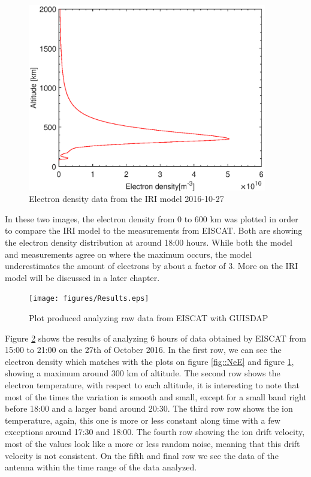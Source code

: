 \begin{minipage}{0.45\textwidth}
	\begin{flushright}
	\begin{figure}[H]
	\centering
	\includegraphics[width=0.93\textwidth]{figures/NeIRI.eps}
	\caption{Electron density data from the IRI model 2016-10-27}
	\label{fig::NeIRI1}
	\end{figure}
	\end{flushright}
\end{minipage}

In these two images, the electron density from 0 to 600 km was plotted in order to compare the IRI model to the measurements from EISCAT. Both are showing the electron density distribution at around 18:00 hours. While both the model and measurements agree on where the maximum occurs, the model underestimates the amount of electrons by about a factor of 3. More on the IRI model will be discussed in a later chapter.

\begin{figure}[H]
	\centering
	\texttt{[image: figures/Results.eps]}
	\caption{Plot produced analyzing raw data from EISCAT with GUISDAP}
	\label{fig::resultsE1}
\end{figure}

\newpage
Figure \ref{fig::resultsE1} shows the results of analyzing 6 hours of data obtained by EISCAT from 15:00  to 21:00 on the 27th of October 2016. In the first row, we can see the electron density which matches with the plots on figure \ref{fig::NeE} and figure \ref{fig::NeIRI1}, showing a maximum around 300 km of altitude. The second row shows the electron temperature, with respect to each altitude, it is interesting to note that most of the times the variation is smooth and small, except for a small band right before 18:00 and a larger band around 20:30. The third row row shows the ion temperature, again, this one is more or less constant along time with a few exceptions around 17:30 and 18:00. The fourth row showing the ion drift velocity,  most of the values look like a more or less random noise, meaning that this drift velocity is not consistent. On the fifth and final row we see the data of the antenna  within the time range of the data analyzed.